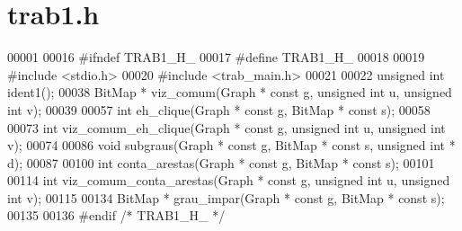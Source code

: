 \section{trab1.\+h}
\label{trab1_8h_source}

\begin{DoxyCode}
00001 
00016 \textcolor{preprocessor}{#ifndef TRAB1\_H\_}
00017 \textcolor{preprocessor}{#define TRAB1\_H\_}
00018 
00019 \textcolor{preprocessor}{#include <stdio.h>}
00020 \textcolor{preprocessor}{#include <trab_main.h>}
00021 
00022 \textcolor{keywordtype}{unsigned} \textcolor{keywordtype}{int} ident1();
00038 BitMap * viz_comum(Graph * \textcolor{keyword}{const} g, \textcolor{keywordtype}{unsigned} \textcolor{keywordtype}{int} u, \textcolor{keywordtype}{unsigned} \textcolor{keywordtype}{int} v);
00039 
00057 \textcolor{keywordtype}{int} eh_clique(Graph * \textcolor{keyword}{const} g, BitMap * \textcolor{keyword}{const} s);
00058 
00073 \textcolor{keywordtype}{int} viz_comum_eh_clique(Graph * \textcolor{keyword}{const} g, \textcolor{keywordtype}{unsigned} \textcolor{keywordtype}{int} u, \textcolor{keywordtype}{unsigned} \textcolor{keywordtype}{int} v);
00074 
00086 \textcolor{keywordtype}{void} subgraus(Graph * \textcolor{keyword}{const} g, BitMap * \textcolor{keyword}{const} s, \textcolor{keywordtype}{unsigned} \textcolor{keywordtype}{int} * d);
00087 
00100 \textcolor{keywordtype}{int} conta_arestas(Graph * \textcolor{keyword}{const} g, BitMap * \textcolor{keyword}{const} s);
00101 
00114 \textcolor{keywordtype}{int} viz_comum_conta_arestas(Graph * \textcolor{keyword}{const} g, \textcolor{keywordtype}{unsigned} \textcolor{keywordtype}{int} u, \textcolor{keywordtype}{unsigned} \textcolor{keywordtype}{int} v);
00115 
00134 BitMap * grau_impar(Graph * \textcolor{keyword}{const} g, BitMap * \textcolor{keyword}{const} s);
00135 
00136 \textcolor{preprocessor}{#endif }\textcolor{comment}{/* TRAB1\_H\_ */}\textcolor{preprocessor}{}
\end{DoxyCode}
